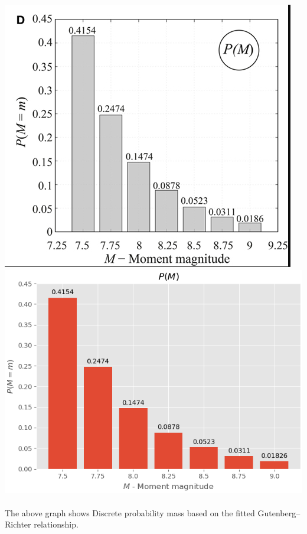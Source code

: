 \documentclass{article}
\begin{document}
\begin{itemize}
 \includegraphics[scale=0.5]{P(M).PNG} \includegraphics[scale=0.5]{plot_d.png}\\ \\
 The above graph shows  Discrete probability mass based on the fitted Gutenberg–Richter relationship.\cite{cite3}
\end{itemize}
\newpage
\end{document}
